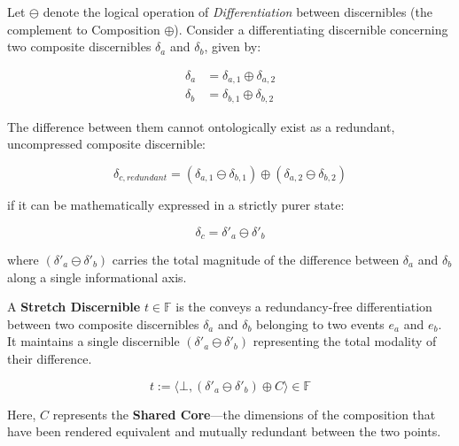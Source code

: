 Let $\ominus$ denote the logical operation of \textit{Differentiation} between
discernibles (the complement to Composition $\oplus$). Consider a differentiating
discernible concerning two composite discernibles $\delta_a$ and $\delta_b$,
given by:

\begin{equation}
\begin{aligned}
    \delta_a &= \delta_{a,1} \oplus \delta_{a,2} \\
    \delta_b &= \delta_{b,1} \oplus \delta_{b,2} 
\end{aligned}
\end{equation}

The difference between them cannot ontologically exist as a redundant, uncompressed
composite discernible:

\begin{equation}
    \delta_{c,redundant} = (\delta_{a,1} \ominus \delta_{b,1}) \oplus (\delta_{a,2} \ominus \delta_{b,2}) 
\end{equation}

if it can be mathematically expressed in a strictly purer state:

\begin{equation}
    \delta_{c} = \delta'_a \ominus \delta'_b 
\end{equation}

where $(\delta'_a \ominus \delta'_b)$ carries the total magnitude of the difference
between $\delta_a$ and $\delta_b$ along a single informational axis.

\begin{formalism}

    A \textbf{Stretch Discernible} $t \in \mathbb{F}$ is the conveys
    a redundancy-free differentiation between two composite discernibles
    $\delta_a$ and $\delta_b$ belonging to two events $e_a$ and $e_b$. It
    maintains a single discernible $(\delta'_a \ominus \delta'_b)$ representing
    the total modality of their difference. 

    \begin{equation}
        t := \langle \bot, (\delta'_a \ominus \delta'_b) \oplus C \rangle \in \mathbb{F}
    \end{equation}

    Here, $C$ represents the \textbf{Shared Core}---the dimensions of the
    composition that have been rendered equivalent and mutually redundant between
    the two points.

\end{formalism}

